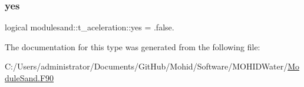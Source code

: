 \mbox{\label{structmodulesand_1_1t__aceleration_a618a3cb27f7378fb9959fb3d2295ee1e}} 
\subsubsection{\texorpdfstring{yes}{yes}}
{\footnotesize\ttfamily logical modulesand\+::t\+\_\+aceleration\+::yes = .false.\hspace{0.3cm}{\ttfamily [private]}}



The documentation for this type was generated from the following file\+:\begin{DoxyCompactItemize}
\item 
C\+:/\+Users/administrator/\+Documents/\+Git\+Hub/\+Mohid/\+Software/\+M\+O\+H\+I\+D\+Water/\mbox{\hyperlink{_module_sand_8_f90}{Module\+Sand.\+F90}}\end{DoxyCompactItemize}
